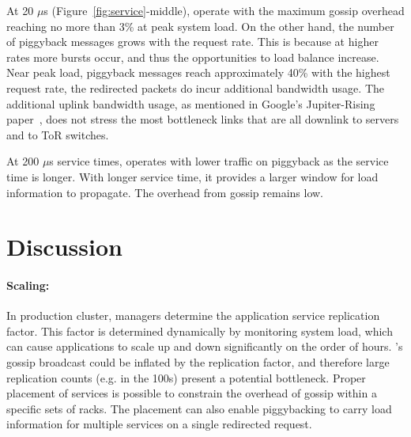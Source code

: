 At 20 $\mu$s (Figure~\ref{fig:service}-middle), \daronpon
operate with the maximum gossip overhead reaching no more than 3\% at peak system load. 
%
On the other hand, the number of piggyback messages grows with the request rate. 
%
This is because at higher rates more bursts occur, and thus the opportunities to load balance increase.
%
Near peak load, piggyback messages reach approximately 40\% with the highest request rate, 
the redirected packets do incur additional bandwidth usage.
%
The additional uplink bandwidth usage, as mentioned in Google's Jupiter-Rising paper~\cite{jupiter-rising}, does not stress the most bottleneck links that are all downlink to servers and to ToR switches. 

At 200 $\mu$s service times, \daronpon operates with lower traffic on piggyback as the service time is longer.
%   
With longer service time, it provides a larger window for load information to propagate. 
%
The overhead from gossip remains low. 
%
%

%

\section{Discussion}
\label{darapon:sec:discuss}

\paragraph{Scaling:} In production cluster, managers determine the application
service replication factor. This factor is determined dynamically by monitoring
system load, which can cause applications to scale up and down significantly on
the order of hours.  \daronpon{}'s gossip broadcast could be inflated by the replication factor, and therefore large replication counts (e.g. in the
100s) present a potential bottleneck.  
%
Proper placement of services is possible to constrain the overhead of gossip within a specific sets of racks. The placement can also enable piggybacking to carry load information for multiple services on a single redirected request.

